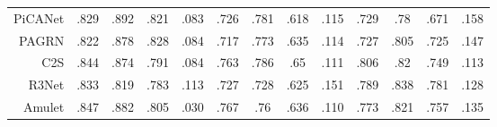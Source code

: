 \begin{table}[!ht]
{\begin{tabular}{rcccccccccccc}
			PiCANet \upcite{liu2018picanet}
			& .829 & .892 & .821 & .083 
			& .726 & .781 & .618 & .115 
			& .729 & .78  & .671 & .158 \\
			
			PAGRN \upcite{wang2018detect}
			& .822 & .878 & .828 & .084 
			& .717 & .773 & .635 & .114 
			& .727 & .805 & .725 & .147 \\
			
			C2S   \upcite{li2018contour}
			& .844 & .874 & .791 & .084 
			& .763 & .786 & .65  & .111 
			& .806 & .82  & .749 & .113 \\
			
			R3Net  \upcite{deng2018r3net}
			& .833 & .819 & .783 & .113 
			& .727 & .728 & .625 & .151 
			& .789 & .838 & .781 & .128 \\
			
			Amulet \upcite{zhang2017amulet}
			& .847 & .882 & .805 & .030 
			& .767 & .76  & .636 & .110  
			& .773 & .821 & .757 & .135 \\
			
			
			\bottomrule[2pt] %
		\end{tabular}
	}
\end{table}



